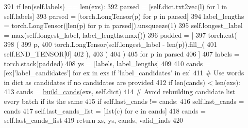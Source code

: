 \begin{DoxyCode}
391         \textcolor{keywordflow}{if} len(self.labels) == len(exs):
392             parsed = [self.dict.txt2vec(l) \textcolor{keywordflow}{for} l \textcolor{keywordflow}{in} self.labels]
393             parsed = [torch.LongTensor(p) \textcolor{keywordflow}{for} p \textcolor{keywordflow}{in} parsed]
394             label\_lengths = torch.LongTensor([len(p) \textcolor{keywordflow}{for} p \textcolor{keywordflow}{in} parsed]).unsqueeze(1)
395             self.longest\_label = max(self.longest\_label, label\_lengths.max())
396             padded = [
397                 torch.cat(
398                     (
399                         p,
400                         torch.LongTensor(self.longest\_label - len(p)).fill\_(
401                             self.END\_TENSOR[0]
402                         ),
403                     )
404                 )
405                 \textcolor{keywordflow}{for} p \textcolor{keywordflow}{in} parsed
406             ]
407             labels = torch.stack(padded)
408             ys = [labels, label\_lengths]
409 
410         cands = [ex[\textcolor{stringliteral}{'label\_candidates'}] \textcolor{keywordflow}{for} ex \textcolor{keywordflow}{in} exs \textcolor{keywordflow}{if} \textcolor{stringliteral}{'label\_candidates'} \textcolor{keywordflow}{in} ex]
411         \textcolor{comment}{# Use words in dict as candidates if no candidates are provided}
412         \textcolor{keywordflow}{if} len(cands) < len(exs):
413             cands = \hyperlink{namespaceparlai_1_1agents_1_1legacy__agents_1_1memnn_1_1memnn__v0_ab07fdb540c02e8e2a1cc7e8cf662a8b8}{build\_cands}(exs, self.dict)
414         \textcolor{comment}{# Avoid rebuilding candidate list every batch if its the same}
415         \textcolor{keywordflow}{if} self.last\_cands != cands:
416             self.last\_cands = cands
417             self.last\_cands\_list = [list(c) \textcolor{keywordflow}{for} c \textcolor{keywordflow}{in} cands]
418         cands = self.last\_cands\_list
419         \textcolor{keywordflow}{return} xs, ys, cands, valid\_inds
420 
\end{DoxyCode}
\mbox{\label{classparlai_1_1agents_1_1legacy__agents_1_1memnn_1_1memnn__v0_1_1MemnnAgent_ae18c65a307c2a3c164beb6cf0bb5b62b}} 
